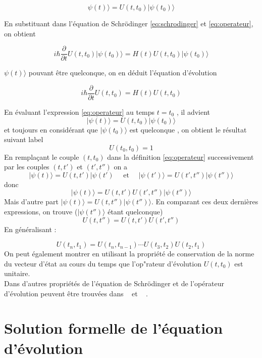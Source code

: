 \documentclass[a4paper, 12pt]{report}
\begin{document}
\begin{equation}
  \psi(t)\rangle = U(t,t_0)|\psi(t_0)\rangle
  \label{eq:operateur}
\end{equation}

En substituant dans l’équation de Schrödinger \eqref{eq:schrodinger} et \eqref{eq:operateur}, on obtient

$$i\hbar\frac{\partial}{\partial t}U(t,t_0)|\psi(t_0)\rangle = H(t)U(t,t_0)|\psi(t_0)\rangle $$

$\psi(t)\rangle$ pouvant être quelconque, on en déduit l’équation d’évolution

\begin{equation}
  i\hbar\frac{\partial}{\partial t}U(t,t_0) = H(t)U(t,t_0)
  \label{eq:évolution}
\end{equation}

En évaluant l’expression \eqref{eq:operateur} au temps $t = t_0 $ , il advient
$$|\psi(t)\rangle = U(t,t_0)|\psi(t_0)\rangle $$ 
et toujours en considérant que $|\psi(t_0)\rangle$ est quelconque , on obtient le résultat suivant 
label
\begin{equation}
  U(t_0,t_0) = 1
  \label{eq: identité}
\end{equation}
En remplaçant le couple $(t,t_0 )$ dans la définition \eqref{eq:operateur} successivement par les couples $(t,t')$ et $(t' , t'')$ on a 
$$|\psi(t)\rangle = U(t,t')|\psi(t') \quad \mbox{ et } \quad |\psi(t')\rangle = U(t',t'')|\psi(t'')\rangle $$
donc
$$|\psi(t)\rangle = U(t,t')U(t',t'')|\psi(t'')\rangle $$
Mais d'autre part $|\psi(t)\rangle = U(t,t'')|\psi(t'')\rangle $. En comparant ces deux dernières expressions,
on trouve ($|\psi(t'')\rangle $ étant quelconque)
$$ U(t,t'') = U(t,t')U(t',t'') $$
En généralisant :

\begin{equation}
  U(t_n,t_1) = U(t_n, t_{n-1}) \cdots U(t_3, t_2)U(t_2, t_1)
  \label{vecteurdetat}
\end{equation}
On peut également montrer en utilisant la propriété de conservation de la norme 
du vecteur d'état au cours du temps que l'op"rateur d'évolution $U(t,t_0) $ est unitaire. \\
Dans d'autres propriétés de l'équation de Schrödinger et de l'opérateur d'évolution peuvent être trouvées dans ~\cite{[1]} et ~\cite{[11]} .

\section{Solution formelle de l’équation d’évolution}
\end{document}
